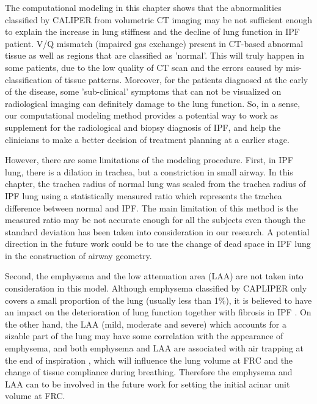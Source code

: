 The computational modeling in this chapter shows that the abnormalities classified by CALIPER from volumetric CT imaging may be not sufficient enough to explain the increase in lung stiffness and the decline of lung function in IPF patient. V/Q mismatch (impaired gas exchange) present in CT-based abnormal tissue as well as regions that are classified as 'normal'. This will truly happen in some patients, due to the low quality of CT scan and the errors caused by mis-classification of tissue patterns. Moreover, for the patients diagnosed at the early of the disease, some 'sub-clinical' symptoms that can not be visualized on radiological imaging can definitely damage to the lung function. So, in a sense, our computational modeling method provides a potential way to work as supplement for the radiological and biopsy diagnosis of IPF, and help the clinicians to make a better decision of treatment planning at a earlier stage. 

However, there are some limitations of the modeling procedure. First, in IPF lung, there is a dilation in trachea, but a constriction in small airway. In this chapter, the trachea radius of normal lung was scaled from the trachea radius of IPF lung using a statistically measured ratio which represents the trachea difference between normal and IPF. The main limitation of this method is the measured ratio may be not accurate enough for all the subjects even though the standard deviation has been taken into consideration in our research. A potential direction in the future work could be to use the change of dead space in IPF lung in the construction of airway geometry. 

Second, the emphysema and the low attenuation area (LAA) are not taken into consideration in this model. Although emphysema classified by CAPLIPER only covers a small proportion of the lung (usually less than 1\%), it is believed to have an impact on the deterioration of lung function together with fibrosis in IPF \citep{cottin2005combined, king2011idiopathic, lin2015combined}. On the other hand, the LAA (mild, moderate and severe) which accounts for a sizable part of the lung may have some correlation with the appearance of emphysema, and both emphysema and LAA are associated with air trapping at the end of inspiration \cite{slebos2015air, hoesein2017air}, which will influence the lung volume at FRC and the change of tissue compliance during breathing. Therefore the emphysema and LAA can to be involved in the future work for setting the initial acinar unit volume at FRC. 


